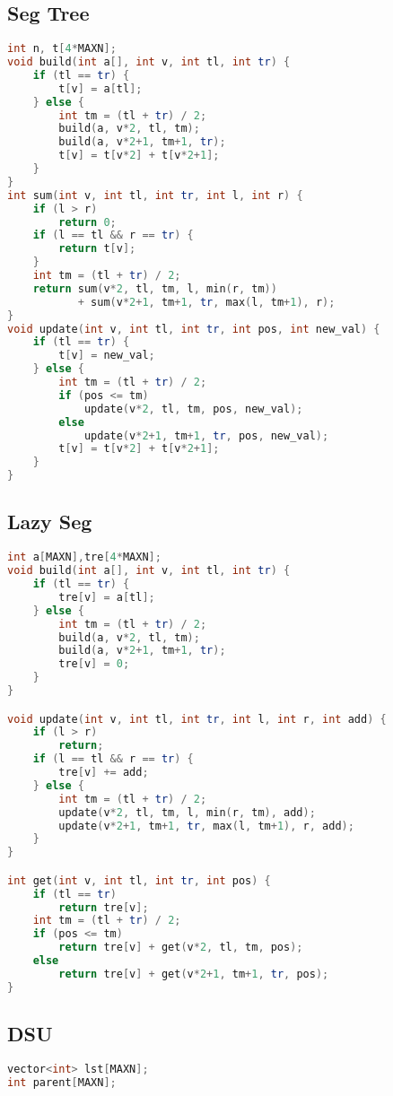 \documentclass[10pt,a4paper,landscape]{article}
\begin{document}
\begin{multicols}{3}
\subsection{Seg Tree}
\begin{lstlisting}[language=C++, breaklines=true]
int n, t[4*MAXN];
void build(int a[], int v, int tl, int tr) {
    if (tl == tr) {
        t[v] = a[tl];
    } else {
        int tm = (tl + tr) / 2;
        build(a, v*2, tl, tm);
        build(a, v*2+1, tm+1, tr);
        t[v] = t[v*2] + t[v*2+1];
    }
}
int sum(int v, int tl, int tr, int l, int r) {
    if (l > r) 
        return 0;
    if (l == tl && r == tr) {
        return t[v];
    }
    int tm = (tl + tr) / 2;
    return sum(v*2, tl, tm, l, min(r, tm))
           + sum(v*2+1, tm+1, tr, max(l, tm+1), r);
}
void update(int v, int tl, int tr, int pos, int new_val) {
    if (tl == tr) {
        t[v] = new_val;
    } else {
        int tm = (tl + tr) / 2;
        if (pos <= tm)
            update(v*2, tl, tm, pos, new_val);
        else
            update(v*2+1, tm+1, tr, pos, new_val);
        t[v] = t[v*2] + t[v*2+1];
    }
}
\end{lstlisting}

\subsection{Lazy Seg}
\begin{lstlisting}[language=C++,breaklines=true]
int a[MAXN],tre[4*MAXN];
void build(int a[], int v, int tl, int tr) {
    if (tl == tr) {
        tre[v] = a[tl];
    } else {
        int tm = (tl + tr) / 2;
        build(a, v*2, tl, tm);
        build(a, v*2+1, tm+1, tr);
        tre[v] = 0;
    }
}

void update(int v, int tl, int tr, int l, int r, int add) {
    if (l > r)
        return;
    if (l == tl && r == tr) {
        tre[v] += add;
    } else {
        int tm = (tl + tr) / 2;
        update(v*2, tl, tm, l, min(r, tm), add);
        update(v*2+1, tm+1, tr, max(l, tm+1), r, add);
    }
}

int get(int v, int tl, int tr, int pos) {
    if (tl == tr)
        return tre[v];
    int tm = (tl + tr) / 2;
    if (pos <= tm)
        return tre[v] + get(v*2, tl, tm, pos);
    else
        return tre[v] + get(v*2+1, tm+1, tr, pos);
}
\end{lstlisting}

\subsection{DSU}
\begin{lstlisting}[language=C++,breaklines=true]
vector<int> lst[MAXN];
int parent[MAXN];


\end{lstlisting}
\end{multicols}
\end{document}
